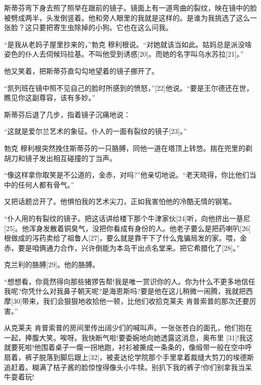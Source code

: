 \documentclass{article}
\begin{document}
斯蒂芬弯下身去照了照举在跟前的镜子。镜面上有一道弯曲的裂纹，映在镜中的脸被劈成两半，头发倒竖着。他和旁人眼里的我就是这样的。是谁为我挑选了这么一张脸？这只要把寄生虫除掉的小狗。它也在这么问我。



“是我从老妈子屋里抄来的，”勃克 \cdot 穆利根说。“对她就该当如此。姑妈总是派没啥姿色的仆人去伺候玛拉基。不叫他受到诱惑[20]。而她的名字叫乌水苏拉[21]。”



他又笑着，把斯蒂芬直勾勾地望着的镜子挪开了。



“凯列班在镜中照不见自己的脸时所感到的愤怒，”[22]他说。“要是王尔德还在世，瞧见你这副尊容，该有多妙。”



斯蒂芬后退了几步，指着镜子沉痛地说：



“这就是爱尔兰艺术的象征。仆人的一面有裂纹的镜子[23]。”



勃克 \cdot 穆利根突然挽住斯蒂芬的一只胳膊，同他一道在塔顶上转悠。揣在兜里的剃胡刀和镜子发出相互碰撞的丁当声。



“像这样拿你取笑是不公道的，金赤，对吗?”他亲切地说。“老天晓得，你比他们当中的任何人都有骨气。”



又把话题岔开了。他惧怕我的艺术尖刀，正如我害怕他的冷酷无情的钢笔。



“仆人用的有裂纹的镜子。把这话讲给楼下那个牛津家伙[24]听，向他挤出一基尼[25]。他浑身发散着铜臭气，没把你看成有身份的人。他老子要么是把药喇叭[26]根做成的泻药卖给了祖鲁人[27]，要么就是靠干下了什么鬼骗局发的家。喂，金赤，要是咱俩通力合作，兴许倒能为本岛干出点名堂来。把它希腊化了[28]。”



克兰利的胳膊[29]。他的胳膊。



“想想看，你竟然得向那些猪猡告帮!我是唯一赏识你的人。你为什么不更多地信任我呢?你凭什么对我鼻子朝天呢?是海恩斯吗?要是他在这儿稍微一闹腾，我就把西摩[30]带来，我们会狠狠地收拾他一顿，比他们收拾克莱夫 \cdot 肯普索普的那次还要厉害。”



从克莱夫 \cdot 肯普索普的房间里传出阔少们的喊叫声。一张张苍白的面孔，他们抱在一起，捧腹大笑。唉呀。我快断气啦!要委婉地向她透露这消息，奥布里 [31]!我这就要死啦!他围着桌子一瘸一拐地跑，衬衫被撕成一条条的，像缎带一般在空中呼扇着，裤子脱落到脚后跟上[32]，被麦达伦学院那个手里拿着裁缝大剪刀的埃德斯追赶着。糊满了桔子酱的脸惊惶得像头小牛犊。别扒下我的裤子!你们别拿我当呆牛耍着玩!
\end{document}
